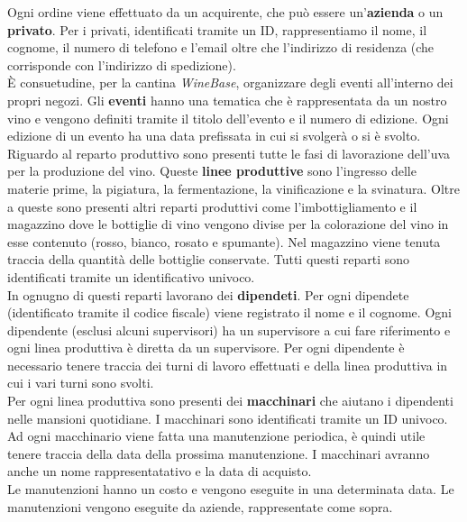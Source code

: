 Ogni ordine viene effettuato da un acquirente, che può essere un'\textbf{azienda} o un \textbf{privato}. Per i privati, identificati tramite un ID, rappresentiamo il nome, il cognome, il numero di telefono e l'email oltre che l'indirizzo di residenza (che corrisponde con l'indirizzo di spedizione).\\
È consuetudine, per la cantina \emph{WineBase}, organizzare degli eventi all'interno dei propri negozi. Gli \textbf{eventi} hanno una tematica che è rappresentata da un nostro vino e vengono definiti tramite il titolo dell'evento e il numero di edizione. Ogni edizione di un evento ha una data prefissata in cui si svolgerà o si è svolto.
Riguardo al reparto produttivo sono presenti tutte le fasi di lavorazione dell'uva per la produzione del vino. Queste \textbf{linee produttive} sono l'ingresso delle materie prime, la pigiatura, la fermentazione, la vinificazione e la svinatura. Oltre a queste sono presenti altri reparti produttivi come l'imbottigliamento e il magazzino dove le bottiglie di vino vengono divise per la colorazione del vino in esse contenuto (rosso, bianco, rosato e spumante). Nel magazzino viene tenuta traccia della quantità delle bottiglie conservate. Tutti questi reparti sono identificati tramite un identificativo univoco.\\
In ognugno di questi reparti lavorano dei \textbf{dipendeti}. Per ogni dipendete (identificato tramite il codice fiscale) viene registrato il nome e il cognome. Ogni dipendente (esclusi alcuni supervisori) ha un supervisore a cui fare riferimento e ogni linea produttiva è diretta da un supervisore. Per ogni dipendente è necessario tenere traccia dei turni di lavoro effettuati e della linea produttiva in cui i vari turni sono svolti.\\
Per ogni linea produttiva sono presenti dei \textbf{macchinari} che aiutano i dipendenti nelle mansioni quotidiane. I macchinari sono identificati tramite un ID univoco. Ad ogni macchinario viene fatta una manutenzione periodica, è quindi utile tenere traccia della data della prossima manutenzione. I macchinari avranno anche un nome rappresentatativo e la data di acquisto.\\
Le manutenzioni hanno un costo e vengono eseguite in una determinata data. Le manutenzioni vengono eseguite da aziende, rappresentate come sopra.